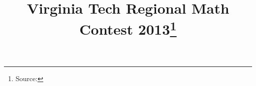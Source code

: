 \documentclass[10pt]{article}
\begin{document}
\title{Virginia Tech Regional Math Contest 2013\footnote{Source: \source}}
\author{\vspace{-2ex}}
\date{\vspace{-6ex}} %
\maketitle







\end{document}
